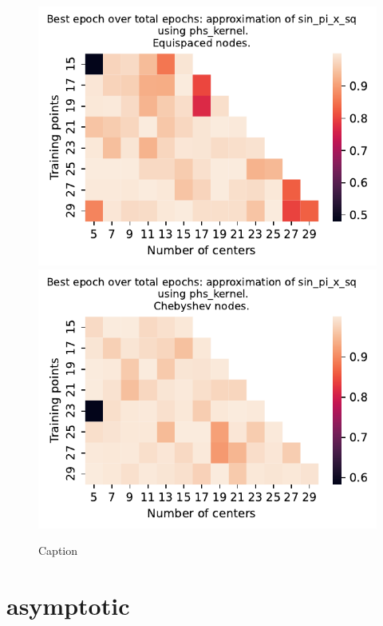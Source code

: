 \documentclass[12pt]{report} %
\begin{document}
\begin{figure}[ht]
    \centering
    
    \includegraphics[width=.49\textwidth]{imagenes/experiments/1d/variational_epochs/sin_pi_x_sq-Kphs_kernel-Equi-epochs.pdf}
    \includegraphics[width=.49\textwidth]{imagenes/experiments/1d/variational_epochs/sin_pi_x_sq-Kphs_kernel-Cheb-epochs.pdf}
    \caption{Caption}
    \label{fig:epochs-sin-pi-x-sq-phs}
\end{figure}

\clearpage 

\section*{asymptotic}
\end{document}
